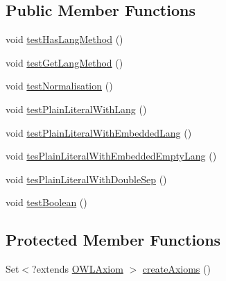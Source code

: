\subsection*{Public Member Functions}
\begin{DoxyCompactItemize}
\item 
void \hyperlink{classorg_1_1semanticweb_1_1owlapi_1_1api_1_1test_1_1literals_1_1_literal_test_case_ac4c534ab8b22f8de4fe4cd343fdd0723}{test\-Has\-Lang\-Method} ()
\item 
void \hyperlink{classorg_1_1semanticweb_1_1owlapi_1_1api_1_1test_1_1literals_1_1_literal_test_case_a6f9243e2e9e7697df785c2012c3c9b53}{test\-Get\-Lang\-Method} ()
\item 
void \hyperlink{classorg_1_1semanticweb_1_1owlapi_1_1api_1_1test_1_1literals_1_1_literal_test_case_a03fe1b6f7c4cb27dd3d22300ab26c0d2}{test\-Normalisation} ()
\item 
void \hyperlink{classorg_1_1semanticweb_1_1owlapi_1_1api_1_1test_1_1literals_1_1_literal_test_case_aa81ca8e00e8e721b13bf9e9c1946d20c}{test\-Plain\-Literal\-With\-Lang} ()
\item 
void \hyperlink{classorg_1_1semanticweb_1_1owlapi_1_1api_1_1test_1_1literals_1_1_literal_test_case_a40c3efc66bb8f66f1517468206b69ebc}{test\-Plain\-Literal\-With\-Embedded\-Lang} ()
\item 
void \hyperlink{classorg_1_1semanticweb_1_1owlapi_1_1api_1_1test_1_1literals_1_1_literal_test_case_a9e83b701fbbe1bd628f8ad26b6e187d8}{tes\-Plain\-Literal\-With\-Embedded\-Empty\-Lang} ()
\item 
void \hyperlink{classorg_1_1semanticweb_1_1owlapi_1_1api_1_1test_1_1literals_1_1_literal_test_case_a5c115587cab427db5fb4c3ced549f097}{tes\-Plain\-Literal\-With\-Double\-Sep} ()
\item 
void \hyperlink{classorg_1_1semanticweb_1_1owlapi_1_1api_1_1test_1_1literals_1_1_literal_test_case_ae7292a0447e8b8bd4414233d1fc5af3b}{test\-Boolean} ()
\end{DoxyCompactItemize}
\subsection*{Protected Member Functions}
\begin{DoxyCompactItemize}
\item 
Set$<$?extends \hyperlink{interfaceorg_1_1semanticweb_1_1owlapi_1_1model_1_1_o_w_l_axiom}{O\-W\-L\-Axiom} $>$ \hyperlink{classorg_1_1semanticweb_1_1owlapi_1_1api_1_1test_1_1literals_1_1_literal_test_case_a220f051a5e48d428ff1837db4c614871}{create\-Axioms} ()
\end{DoxyCompactItemize}


